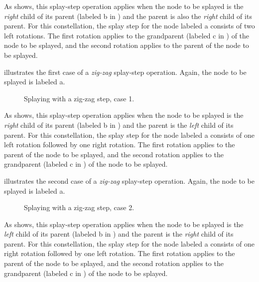 As  shows, this splay-step operation
applies when the node to be splayed is the \emph{right} child of its
parent (labeled \textsf{b} in ) and the
parent is also the \emph{right} child of its parent.  For this
constellation, the splay step for the node labeled \textsf{a} consists
of two left rotations.  The first rotation applies to the grandparent
(labeled \textsf{c} in ) of the node to be
splayed, and the second rotation applies to the parent of the node to
be splayed.

 illustrates the first case of a
\emph{zig-zag} splay-step operation.  Again, the node to be splayed is
labeled \textsf{a}.

\begin{figure}
\begin{center}
\end{center}
\caption{\label{fig-splay-zig-zag-1}
Splaying with a zig-zag step, case 1.}
\end{figure}

As  shows, this splay-step operation
applies when the node to be splayed is the \emph{right} child of its
parent (labeled \textsf{b} in ) and the
parent is the \emph{left} child of its parent.  For this
constellation, the splay step for the node labeled \textsf{a} consists
of one left rotation followed by one right rotation.  The first
rotation applies to the parent of the node to be splayed, and the
second rotation applies to the grandparent (labeled \textsf{c} in
) of the node to be splayed.

 illustrates the second case of a
\emph{zig-zag} splay-step operation.  Again, the node to be splayed is
labeled \textsf{a}.

\begin{figure}
\begin{center}
\end{center}
\caption{\label{fig-splay-zig-zag-2}
Splaying with a zig-zag step, case 2.}
\end{figure}

As  shows, this splay-step operation
applies when the node to be splayed is the \emph{left} child of its
parent (labeled \textsf{b} in ) and the
parent is the \emph{right} child of its parent.  For this
constellation, the splay step for the node labeled \textsf{a} consists
of one right rotation followed by one left rotation.  The first
rotation applies to the parent of the node to be splayed, and the
second rotation applies to the grandparent (labeled \textsf{c} in
) of the node to be splayed.

